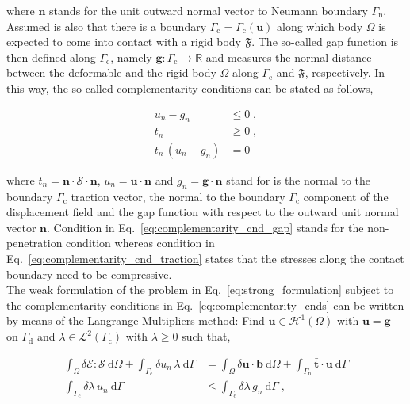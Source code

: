 \documentclass[10pt,a4paper]{article}
\begin{document}
where $\mathbf{n}$ stands for the unit outward normal vector to Neumann boundary $\Gamma_{\text{n}}$.\\

Assumed is also that there is a boundary $\Gamma_{\text{c}} = \Gamma_{\text{c}} (\mathbf{u})$ along which body $\Omega$ is expected to come into contact with a rigid body $\mathfrak{F}$. The so-called gap function is then defined along $\Gamma_{\text{c}}$, namely $\mathbf{g}:\Gamma_{\text{c}} \rightarrow \mathbb{R}$ and measures the normal distance between the deformable and the rigid body $\Omega$ along $\Gamma_{\text{c}}$ and $\mathfrak{F}$, respectively. In this way, the so-called complementarity conditions can be stated as follows,

\begin{subequations}
	\begin{alignat}{1}
		u_n - g_n &\le 0 \;, \label{eq:complementarity_cnd_gap} \\
		t_n &\ge 0 \;,  \label{eq:complementarity_cnd_traction} \\
		t_n\,(u_n - g_n) &= 0 \label{eq:complementarity_cnd_mixed}
	\end{alignat}
	\label{eq:complementarity_cnds}
\end{subequations}

where $t_n = \mathbf{n} \cdot \boldsymbol{\mathcal{S}} \cdot \mathbf{n}$, $u_n = \mathbf{u} \cdot \mathbf{n}$ and $g_n = \mathbf{g} \cdot \mathbf{n}$ stand for is the normal to the boundary $\Gamma_{\text{c}}$ traction vector, the normal to the boundary $\Gamma_{\text{c}}$ component of the displacement field and the gap function with respect to the outward unit normal vector $\mathbf{n}$. Condition in Eq.~\eqref{eq:complementarity_cnd_gap} stands for the non-penetration condition whereas condition in Eq.~\eqref{eq:complementarity_cnd_traction} states that the stresses along the contact boundary need to be compressive.\\

The weak formulation of the problem in Eq.~\eqref{eq:strong_formulation} subject to the complementarity conditions in Eq.~\eqref{eq:complementarity_cnds} can be written by means of the Langrange Multipliers method: Find $\mathbf{u} \in \boldsymbol{\mathcal{H}}^1 (\Omega)$ with $\mathbf{u} = \mathbf{g}$ on $\Gamma_{\text{d}}$ and $\lambda \in \mathcal{L}^2(\Gamma_{\text{c}})$ with $\lambda \ge 0$ such that,

\begin{subequations}
	\begin{alignat}{1}
		\int_{\Omega} \delta \boldsymbol{\mathcal{E}} : \boldsymbol{\mathcal{S}} \: \text{d} \Omega + \int_{\Gamma_{\text{c}}} \delta u_n \, \lambda \: \text{d} \Gamma &= \int_{\Omega} \delta \mathbf{u} \cdot \mathbf{b} \: \text{d} \Omega + \int_{\Gamma_{\text{n}}} \bar{\mathbf{t}} \cdot \mathbf{u} \: \text{d} \Gamma \label{eq:variational_formulation_delta_u} \\
		\int_{\Gamma_{\text{c}}} \delta \lambda \, u_n \: \text{d} \Gamma &\le \int_{\Gamma_{\text{c}}} \delta \lambda \, g_n \: \text{d} \Gamma \;, \label{eq:variational_formulation_delta_lambda}
	\end{alignat}
\end{subequations}
\end{document}
